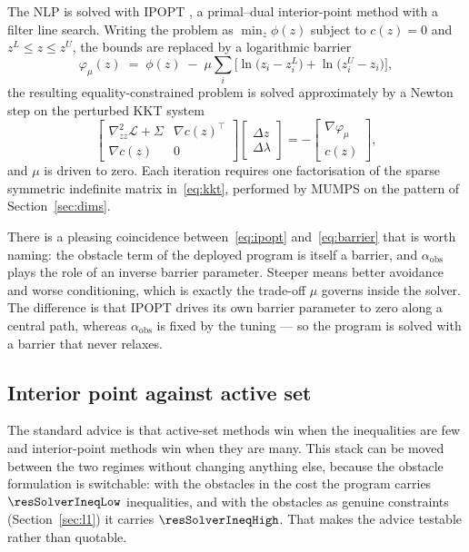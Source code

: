 \documentclass[11pt,a4paper]{article}
\newcommand{\aobs}{\alpha_{\mathrm{obs}}}
\begin{document}
The NLP is solved with IPOPT \cite{wachter2006ipopt}, a primal--dual interior-point method with a filter
line search. Writing the problem as $\min_z \phi(z)$ subject to $c(z)=0$ and $z^L\le z\le z^U$, the bounds
are replaced by a logarithmic barrier
\begin{equation}
  \varphi_\mu(z) \;=\; \phi(z) \;-\; \mu\sum_i\Big[\ln\!\big(z_i-z_i^L\big)+\ln\!\big(z_i^U-z_i\big)\Big],
  \label{eq:ipopt}
\end{equation}
the resulting equality-constrained problem is solved approximately by a Newton step on the perturbed KKT
system
\begin{equation}
  \begin{bmatrix}
    \nabla^2_{zz}\mathcal{L} + \Sigma & \nabla c(z)^{\!\top}\\
    \nabla c(z) & 0
  \end{bmatrix}
  \begin{bmatrix}\Delta z\\ \Delta\lambda\end{bmatrix}
  = -\begin{bmatrix}\nabla\varphi_\mu\\ c(z)\end{bmatrix},
  \label{eq:kkt}
\end{equation}
and $\mu$ is driven to zero. Each iteration requires one factorisation of the sparse symmetric indefinite
matrix in~\eqref{eq:kkt}, performed by MUMPS on the pattern of Section~\ref{sec:dims}.

There is a pleasing coincidence between~\eqref{eq:ipopt} and~\eqref{eq:barrier} that is worth naming: the
obstacle term of the deployed program is itself a barrier, and $\aobs$ plays the role of an inverse barrier
parameter. Steeper means better avoidance and worse conditioning, which is exactly the trade-off $\mu$
governs inside the solver. The difference is that IPOPT drives its own barrier parameter to zero along a
central path, whereas $\aobs$ is fixed by the tuning --- so the program is solved with a barrier that never
relaxes.

\subsection{Interior point against active set}
\label{sec:solvercmp}

The standard advice is that active-set methods win when the inequalities are few and interior-point methods
win when they are many. This stack can be moved between the two regimes without changing anything else,
because the obstacle formulation is switchable: with the obstacles in the cost the program carries
$\resSolverIneqLow$ inequalities, and with the obstacles as genuine constraints (Section~\ref{sec:l1}) it
carries $\resSolverIneqHigh$. That makes the advice testable rather than quotable.
\end{document}
